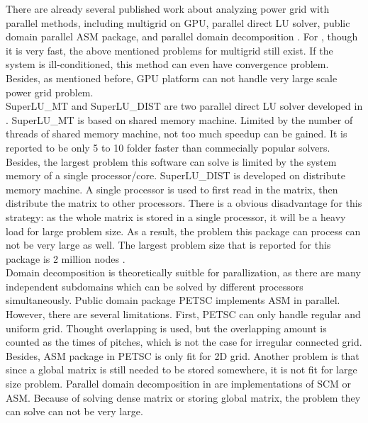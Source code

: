 \documentclass{sig-alternate}
\begin{document}
	There are already several published work about analyzing power grid with parallel methods, including multigrid on GPU\cite{Zhuofeng}, parallel direct LU 
	solver\cite{Super_LU_website}, public domain parallel ASM package\cite{PETSC_website}, and parallel domain decomposition
	\cite{kaisun}\cite{voronov}. For \cite{Zhuofeng}, though it is very fast, the above mentioned problems for multigrid still exist. 
	If the system is ill-conditioned, this method can even have convergence problem. Besides, as mentioned before, GPU platform 
	can not handle very large scale power grid problem.\\
 
	SuperLU\_MT and SuperLU\_DIST are two parallel direct LU solver developed in \cite{Super_LU_website}. SuperLU\_MT is 
	based on shared memory machine. Limited by the number of threads of shared memory machine, not too much speedup can be gained. 
	It is reported to be only 5 to 10 folder faster than commecially popular solvers\cite{Super_LU_website}. Besides, the largest 
	problem this software can solve is limited by the system memory of a single processor/core. SuperLU\_DIST is developed on 
	distribute 
	memory machine. A single processor is used to first read in the matrix, then distribute the matrix to other processors. 
	There is a obvious disadvantage for this strategy: as the whole matrix is stored 
	in a single processor, it will be a heavy load for large problem size. As a result, the problem this package can 
	process can not be very large as well. The largest problem size that is reported for this package is 2 million nodes
	\cite{Super_LU_website}.\\

	Domain decomposition is theoretically suitble for parallization, as there are many independent subdomains which can be
	solved by different processors simultaneously. Public domain package PETSC\cite{PETSC_website} implements ASM in parallel.
	However, there are several limitations. First, PETSC can only handle regular and uniform grid. Thought overlapping is 
	used, but the overlapping amount is counted as the times of pitches, which is not the case for irregular connected grid. 
	Besides, ASM package in PETSC is only fit for 2D grid. Another problem is that since a global matrix is still
	needed to be stored somewhere, it is not fit for large size problem. Parallel domain decomposition in \cite{kaisun}\cite{voronov} 
	are implementations of SCM or ASM. Because of solving dense matrix or storing global matrix, the problem they can solve can not 
	be very large.\\
\end{document}

